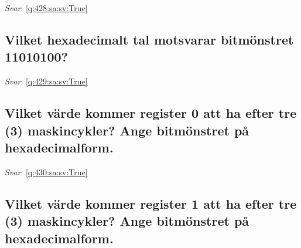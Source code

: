 \documentclass[a4paper,11pt,oneside]{article}
\begin{document}
\begin{sloppypar}
\label{q:428:sa:sv:False}

\vspace{2cm}

\noindent\makebox[\textwidth]{\hrulefill}

\vspace{1cm}

\textit{Svar}: \autoref{q:428:sa:sv:True}



\subsection{Vilket hexadecimalt tal motsvarar bitm\"onstret 11010100?}

\label{q:429:sa:sv:False}

\vspace{2cm}

\noindent\makebox[\textwidth]{\hrulefill}

\vspace{1cm}

\textit{Svar}: \autoref{q:429:sa:sv:True}



\subsection{Vilket v\"arde kommer register 0 att ha efter tre (3) maskincykler? Ange bitm\"onstret p\r{a} hexadecimalform.}

\label{q:430:sa:sv:False}

\vspace{2cm}

\noindent\makebox[\textwidth]{\hrulefill}

\vspace{1cm}

\textit{Svar}: \autoref{q:430:sa:sv:True}



\subsection{Vilket v\"arde kommer register 1 att ha efter tre (3) maskincykler? Ange bitm\"onstret p\r{a} hexadecimalform.}

\label{q:431:sa:sv:False}

\vspace{2cm}

\noindent\makebox[\textwidth]{\hrulefill}

\vspace{1cm}


\end{sloppypar}
\end{document}
